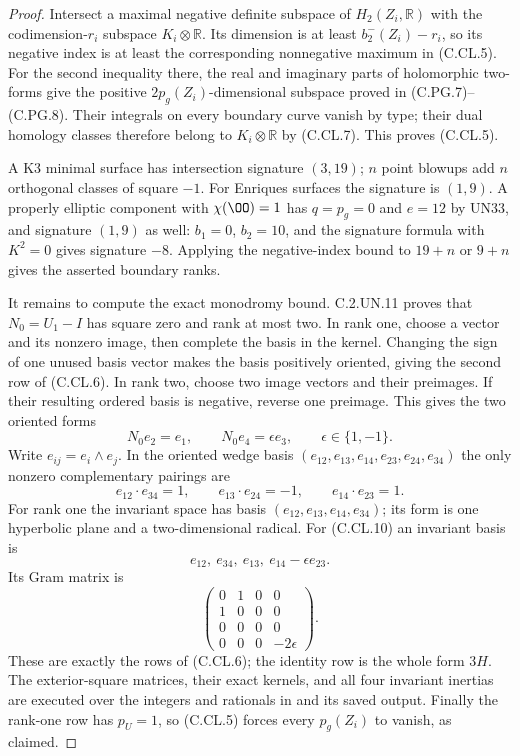 \begin{proof}
Intersect a maximal negative definite
subspace of $H_2(Z_i,\mathbb R)$ with
the codimension-$r_i$ subspace $K_i\otimes\mathbb R$.
Its dimension is at least
$b_2^-(Z_i)-r_i$, so its negative index
is at least the corresponding nonnegative
maximum in (C.CL.5). For the second
inequality there, the real and imaginary
parts of holomorphic two-forms give the
positive $2p_g(Z_i)$-dimensional subspace
proved in (C.PG.7)--(C.PG.8). Their
integrals on every boundary curve
vanish by type; their dual homology
classes therefore belong to
$K_i\otimes\mathbb R$ by (C.CL.7).
This proves (C.CL.5).

A K3 minimal surface has intersection
signature $(3,19)$; $n$ point blowups
add $n$ orthogonal classes of square
$-1$. For Enriques surfaces the
signature is $(1,9)$. A properly
elliptic component with $\chi(\OO)=1$
has $q=p_g=0$ and $e=12$ by UN33,
and signature $(1,9)$ as well:
$b_1=0$, $b_2=10$, and the signature
formula with $K^2=0$ gives signature
$-8$. Applying the negative-index
bound to $19+n$ or $9+n$ gives
the asserted boundary ranks.

It remains to compute the exact
monodromy bound. C.2.UN.11 proves
that $N_0=U_1-I$ has square zero
and rank at most two. In rank one,
choose a vector and its nonzero
image, then complete the basis in
the kernel. Changing the sign of
one unused basis vector makes the
basis positively oriented, giving
the second row of (C.CL.6).
In rank two, choose two image
vectors and their preimages. If
their resulting ordered basis is
negative, reverse one preimage.
This gives the two oriented forms
\[
          N_0e_2=e_1,\qquad N_0e_4=\epsilon e_3,
                     \qquad\epsilon\in\{1,-1\}.     \tag{C.CL.10}
\]
Write $e_{ij}=e_i\wedge e_j$.
In the oriented wedge basis
$(e_{12},e_{13},e_{14},e_{23},e_{24},e_{34})$
the only nonzero complementary
pairings are
\[
 e_{12}\cdot e_{34}=1,\qquad
 e_{13}\cdot e_{24}=-1,\qquad
 e_{14}\cdot e_{23}=1.                              \tag{C.CL.11}
\]
For rank one the invariant space
has basis $(e_{12},e_{13},e_{14},e_{34})$;
its form is one hyperbolic plane
and a two-dimensional radical.
For (C.CL.10) an invariant basis is
\[
       e_{12},\ e_{34},\ e_{13},\ e_{14}-\epsilon e_{23}.
                                                               \tag{C.CL.12}
\]
Its Gram matrix is
\[
 \begin{pmatrix}
 0&1&0&0\\
 1&0&0&0\\
 0&0&0&0\\
 0&0&0&-2\epsilon
 \end{pmatrix}.                                               \tag{C.CL.13}
\]
These are exactly the rows of
(C.CL.6); the identity row is
the whole form $3H$.
The exterior-square matrices,
their exact kernels, and all
four invariant inertias are
executed over the integers and
rationals in
and its saved output. Finally
the rank-one row has $p_U=1$,
so (C.CL.5) forces every
$p_g(Z_i)$ to vanish, as claimed.
\end{proof}

